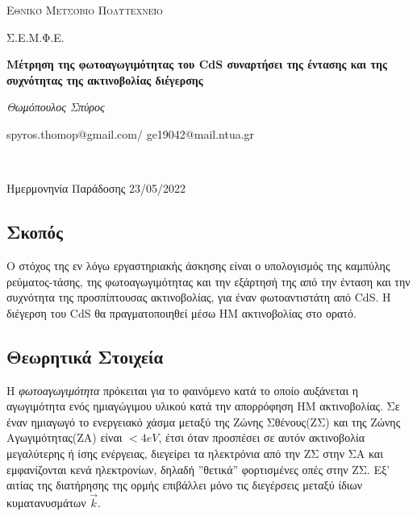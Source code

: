 \documentclass[a4paper]{article}
\begin{document}
\begin{titlepage}			%
	\centering
	{\scshape\LARGE Εθνικό Μετσόβιο Πολυτεχνείο\par}
	{\scshape \LARGE Σ.Ε.Μ.Φ.Ε.\par}
	\vspace{1cm}
	{\huge\bfseries Μέτρηση της φωτοαγωγιμότητας του CdS συναρτήσει της έντασης και της συχνότητας της ακτινοβολίας διέγερσης\par}
	\vspace{1cm}
	{\Large\itshape Θωμόπουλος Σπύρος\par}		%
	
	{\large spyros.thomop@gmail.com/ ge19042@mail.ntua.gr\par \hfill \\}%
	\vspace{1cm}
	{\large Ημερμονηνία Παράδοσης 23/05/2022\par}
\end{titlepage}

\subsection*{Σκοπός}
	
	Ο στόχος της εν λόγω εργαστηριακής άσκησης είναι ο υπολογισμός της καμπύλης ρεύματος-τάσης, της φωτοαγωγιμότητας και την εξάρτησή της από την ένταση και την συχνότητα της προσπίπτουσας ακτινοβολίας, για έναν φωτοαντιστάτη από CdS. Η διέγερση του CdS θα πραγματοποιηθεί μέσω ΗΜ ακτινοβολίας στο ορατό.
	
\subsection*{Θεωρητικά Στοιχεία}

	Η \textit{φωτοαγωγιμότητα} πρόκειται για το φαινόμενο κατά το οποίο αυξάνεται η αγωγιμότητα ενός ημιαγώγιμου υλικού κατά την απορρόφηση ΗΜ ακτινοβολίας. Σε έναν ημιαγωγό το ενεργειακό χάσμα μεταξύ της Ζώνης Σθένους(ΖΣ) και της Ζώνης Αγωγιμότητας(ΖΑ) είναι $<4eV$, έτσι όταν προσπέσει σε αυτόν ακτινοβολία μεγαλύτερης ή ίσης ενέργειας, διεγείρει τα ηλεκτρόνια από την ΖΣ στην ΣΑ και εμφανίζονται κενά ηλεκτρονίων, δηλαδή ''θετικά'' φορτισμένες οπές στην ΖΣ. Εξ' αιτίας της διατήρησης της ορμής επιβάλλει μόνο τις διεγέρσεις μεταξύ ίδιων κυματανυσμάτων $\vec{k}$.
	
\end{document}
